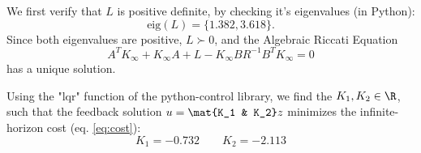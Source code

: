 \documentclass{homework}
\begin{document}
\begin{letterenum}
We first verify that $L$ is positive definite, by checking it's eigenvalues
(in Python):
\begin{equation*}
    \text{eig}(L) = \{1.382, 3.618\}.
\end{equation*}
Since both eigenvalues are positive, $L\succ 0$, and the Algebraic Riccati Equation
\begin{equation*}
    A^T K_\infty + K_\infty A + L - K_\infty B R^{-1} B^T K_\infty = 0
\end{equation*}
has a unique solution.

Using the "lqr" function of the python-control library,
we find the $K_1,K_2\in\R$, such that the feedback solution $u=\mat{K_1 & K_2} z$
minimizes the infinite-horizon cost (eq. \ref{eq:cost}):
\begin{equation*}
    K_1 = -0.732 \qquad K_2 = -2.113
\end{equation*}

\end{letterenum}
\end{document}
